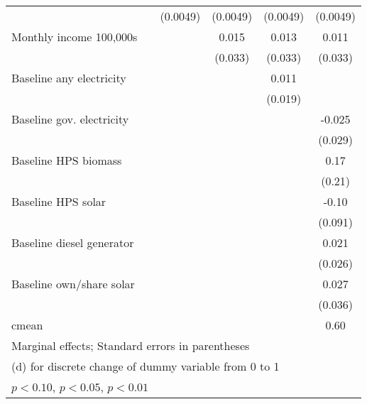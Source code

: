 \begin{table}[htbp]
\begin{tabular*}{1\hsize}{@{\hskip\tabcolsep\extracolsep\fill}l*{5}{c}}
                &                  & (0.0049)         & (0.0049)         & (0.0049)         & (0.0049)         \\
Monthly income 100,000s&                  &                  &    0.015         &    0.013         &    0.011         \\
                &                  &                  &  (0.033)         &  (0.033)         &  (0.033)         \\
Baseline any electricity&                  &                  &                  &    0.011         &                  \\
                &                  &                  &                  &  (0.019)         &                  \\
Baseline gov. electricity&                  &                  &                  &                  &   -0.025         \\
                &                  &                  &                  &                  &  (0.029)         \\
Baseline HPS biomass&                  &                  &                  &                  &     0.17         \\
                &                  &                  &                  &                  &   (0.21)         \\
Baseline HPS solar&                  &                  &                  &                  &    -0.10         \\
                &                  &                  &                  &                  &  (0.091)         \\
Baseline diesel generator&                  &                  &                  &                  &    0.021         \\
                &                  &                  &                  &                  &  (0.026)         \\
Baseline own/share solar&                  &                  &                  &                  &    0.027         \\
                &                  &                  &                  &                  &  (0.036)         \\
\midrule
cmean           &                  &                  &                  &                  &     0.60         \\
\bottomrule
\multicolumn{6}{l}{\footnotesize Marginal effects; Standard errors in parentheses}\\
\multicolumn{6}{l}{\footnotesize  (d) for discrete change of dummy variable from 0 to 1}\\
\multicolumn{6}{l}{\footnotesize \sym{*} \(p<0.10\), \sym{**} \(p<0.05\), \sym{***} \(p<0.01\)}\\
\end{tabular*}
\end{table}
